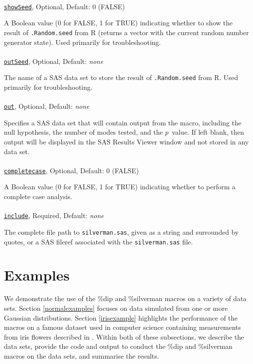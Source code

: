 \documentclass[]{interact}
\theoremstyle{plain}%
\theoremstyle{definition}
\theoremstyle{remark}
\begin{document}
\paragraph*{}
\texttt{\underline{showSeed}}, Optional, Default: 0 (FALSE)

A Boolean value (0 for FALSE, 1 for TRUE) indicating whether to show the result of \texttt{.Random.seed} from R (returns a vector with the current random number generator state). Used primarily for troubleshooting.

\paragraph*{}
\texttt{\underline{outSeed}}, Optional, Default: \textit{none}

The name of a SAS data set to store the result of \texttt{.Random.seed} from R. Used primarily for troubleshooting.

\paragraph*{}
\texttt{\underline{out}}, Optional, Default: \textit{none}

Specifies a SAS data set that will contain output from the macro, including the null hypothesis, the number of modes tested, and the $p$~value. If left blank, then output will be displayed in the SAS Results Viewer window and not stored in any data set.

\paragraph*{}
\texttt{\underline{completecase}}, Optional, Default: 0 (FALSE)

A Boolean value (0 for FALSE, 1 for TRUE) indicating whether to perform a complete case analysis.

\paragraph*{}
\texttt{\underline{include}}, Required, Default: \textit{none}

The complete file path to \texttt{silverman.sas}, given as a string and surrounded by quotes, or a SAS fileref associated with the \texttt{silverman.sas} file.

\section{Examples}\label{examples}
We demonstrate the use of the \%dip and \%silverman macros on a variety of data sets. Section \ref{normalexamples} focuses on data simulated from one or more Gaussian distributions. Section \ref{irisexample} highlights the performance of the macros on a famous dataset used in computer science containing measurements from iris flowers described in \cite{fisher1936use}. Within both of these subsections, we describe the data sets, provide the code and output to conduct the \%dip and \%silverman macros on the data sets, and summarise the results.
\end{document}

